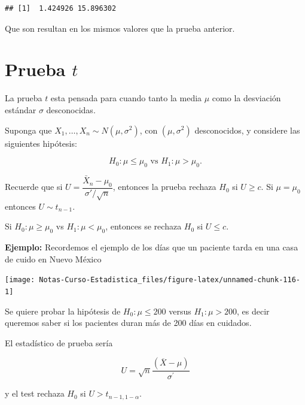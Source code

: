 \documentclass[
  12pt,
]{book}
\newenvironment{Shaded}{\begin{snugshade}}{\end{snugshade}}
\newcommand{\KeywordTok}[1]{\textcolor[rgb]{0.13,0.29,0.53}{\textbf{#1}}}
\newcommand{\NormalTok}[1]{#1}
\newcommand{\OperatorTok}[1]{\textcolor[rgb]{0.81,0.36,0.00}{\textbf{#1}}}
\newcommand{\StringTok}[1]{\textcolor[rgb]{0.31,0.60,0.02}{#1}}
\begin{document}
\begin{verbatim}
## [1]  1.424926 15.896302
\end{verbatim}

Que son resultan en los mismos valores que la prueba anterior.

\hypertarget{prueba-t}{%
\section{\texorpdfstring{Prueba \(t\)}{Prueba t}}\label{prueba-t}}

La prueba \(t\) esta pensada para cuando tanto la media \(\mu\) como la
desviación estándar \(\sigma\) desconocidas.

Suponga que \(X_1,\dots, X_n \sim N(\mu,\sigma^2)\), con \((\mu,\sigma^2)\)
desconocidos, y considere las siguientes hipótesis:

\[H_0: \mu\leq\mu_0 \text{ vs } H_1:\mu>\mu_0.\]

Recuerde que si \(U = \dfrac{\bar X_n -\mu_0}{\sigma' /\sqrt n}\), entonces la
prueba rechaza \(H_0\) si \(U\geq c\). Si \(\mu=\mu_0\) entonces \(U \sim t_{n-1}\).

Si \(H_0: \mu\geq\mu_0\) vs \(H_1: \mu<\mu_0\), entonces se rechaza \(H_0\) si \(U\leq c\).

\textbf{Ejemplo:} Recordemos el ejemplo de los días que un paciente tarda en una casa
de cuido en Nuevo México

\begin{Shaded}
\end{Shaded}

\begin{center}\texttt{[image: Notas-Curso-Estadistica\_files/figure-latex/unnamed-chunk-116-1]} \end{center}

Se quiere probar la hipótesis de \(H_{0}: \mu \leq 200\) versus \(H_{1}: \mu > 200\),
es decir queremos saber si los pacientes duran más de 200 días en cuidados.

El estadístico de prueba sería

\[
U =  \sqrt{n} \frac{(\overline{X} - \mu)}{\sigma ^{\prime}}
\]

y el test rechaza \(H_{0}\) si \(U>t_{n-1, 1-\alpha}\).
\end{document}
